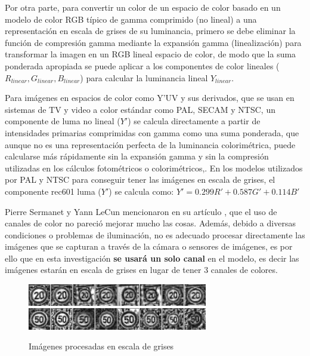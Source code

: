 		Por otra parte, para convertir un color de un espacio de color basado en un modelo de color RGB típico de gamma comprimido (no lineal) a una representación en escala de grises de su luminancia, primero se debe eliminar la función de compresión gamma mediante la expansión gamma (linealización) para transformar la imagen en un RGB lineal espacio de color, de modo que la suma ponderada apropiada se puede aplicar a los componentes de color lineales ($R_{linear} , G_{linear} , B_{linear}$) para calcular la luminancia lineal $Y_{linear}$.

		Para imágenes en espacios de color como Y'UV y sus derivados, que se usan en sistemas de TV y video a color estándar como PAL, SECAM y NTSC, un componente de luma no lineal ($Y'$) se calcula directamente a partir de intensidades primarias comprimidas con gamma como una suma ponderada, que aunque no es una representación perfecta de la luminancia colorimétrica, puede calcularse más rápidamente sin la expansión gamma y sin la compresión utilizadas en los cálculos fotométricos o colorimétricos,\citep{POYNTON2003257}. En los modelos utilizados por PAL y NTSC para conseguir tener las imágenes en escala de grises, el componente rec601 luma ($Y'$) se calcula como: \begingroup\makeatletter\def\f@size{14.8}\check@mathfonts	$Y' = 0.299R' + 0.587G' +0.114B'$ \endgroup

		Pierre Sermanet y Yann LeCun mencionaron en su artículo \citep{LeCun}, que el uso de canales de color no pareció mejorar mucho las cosas. Además, debido a diversas condiciones o problemas de iluminación, no es adecuado procesar directamente las imágenes que se capturan a través de la cámara o sensores de imágenes, es por ello que en esta investigación {\bf se usará un solo canal} en el modelo, es decir las imágenes estarán en escala de grises en lugar de tener 3 canales de colores.
		
			\begin{figure}[H]
			\begin{center}
			\includegraphics[width=0.7\textwidth]{images/desarrollo/Normalization_Processing/proc_test1}
			\includegraphics[width=0.7\textwidth]{images/desarrollo/Normalization_Processing/proc_test2}
			\end{center}
			\begin{center}
			\caption{\small{Imágenes procesadas en escala de grises}}
			\vspace{-1em}
			{\small{\fontsize{10}{16.8}\selectfont {Fuente propia}}}
			\end{center}
			\vspace{-1.5em}
			\end{figure}

